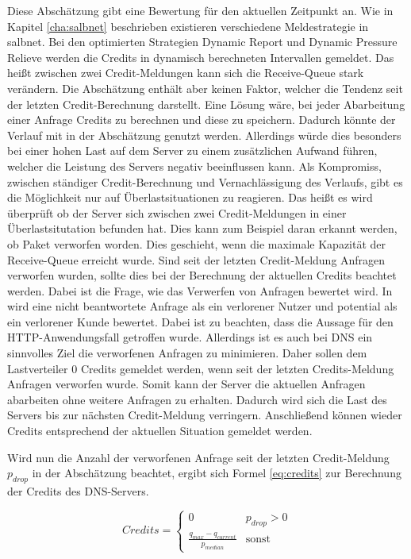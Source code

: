 \documentclass[a4paper, 12pt, BCOR10mm, DIV12, toc=bibliography, toc=listof, german]{scrbook}
\begin{document}
		Diese Abschätzung gibt eine Bewertung für den aktuellen Zeitpunkt an. Wie in Kapitel
		\ref{cha:salbnet} beschrieben existieren verschiedene Meldestrategie in salbnet. Bei den
		optimierten Strategien Dynamic Report und Dynamic Pressure Relieve werden die Credits in
		dynamisch berechneten Intervallen gemeldet. Das heißt zwischen zwei Credit-Meldungen kann sich
		die Receive-Queue stark verändern. Die Abschätzung enthält aber keinen Faktor, welcher die
		Tendenz seit der letzten Credit-Berechnung darstellt. Eine Lösung wäre, bei jeder Abarbeitung
		einer Anfrage Credits zu berechnen und diese zu speichern. Dadurch könnte der Verlauf mit in der
		Abschätzung genutzt werden. Allerdings würde dies besonders bei einer hohen Last auf dem Server
		zu einem zusätzlichen Aufwand führen, welcher die Leistung des Servers negativ beeinflussen
		kann. Als Kompromiss, zwischen ständiger Credit-Berechnung und Vernachlässigung des Verlaufs,
		gibt es die Möglichkeit nur auf Überlastsituationen zu reagieren. Das heißt es wird überprüft ob
		der Server sich zwischen zwei Credit-Meldungen in einer Überlastsitutation befunden hat. Dies
		kann zum Beispiel daran erkannt werden, ob Paket verworfen worden. Dies geschieht, wenn die
		maximale Kapazität der Receive-Queue erreicht wurde. Sind seit der letzten Credit-Meldung
		Anfragen verworfen wurden, sollte dies bei der Berechnung der aktuellen Credits beachtet werden.
		Dabei ist die Frage, wie das Verwerfen von Anfragen bewertet wird. In \cite{scsczile2008} wird
		eine nicht beantwortete Anfrage als ein verlorener Nutzer und potential als ein verlorener Kunde
		bewertet. Dabei ist zu beachten, dass die Aussage für den HTTP-Anwendungsfall getroffen wurde.
		Allerdings ist es auch bei DNS ein sinnvolles Ziel die verworfenen Anfragen zu minimieren. Daher
		sollen dem Lastverteiler 0 Credits gemeldet werden, wenn seit der letzten Credits-Meldung
		Anfragen verworfen wurde. Somit kann der Server die aktuellen Anfragen abarbeiten ohne weitere
		Anfragen zu erhalten. Dadurch wird sich die Last des Servers bis zur nächsten Credit-Meldung
		verringern. Anschließend können wieder Credits entsprechend der aktuellen Situation gemeldet
		werden.
		
		Wird nun die Anzahl der verworfenen Anfrage seit der letzten Credit-Meldung $p_{drop}$
		in der Abschätzung beachtet, ergibt sich Formel \ref{eq:credits} zur Berechnung der Credits des
		DNS-Servers.

		\begin{equation}
			Credits = \begin{cases}0 & p_{drop}>0\\ \frac{\displaystyle q_{max} - q_{current}}{\displaystyle p_{median}}
			  & \text{sonst}\end{cases}
			\label{eq:credits}
		\end{equation}
\end{document}
